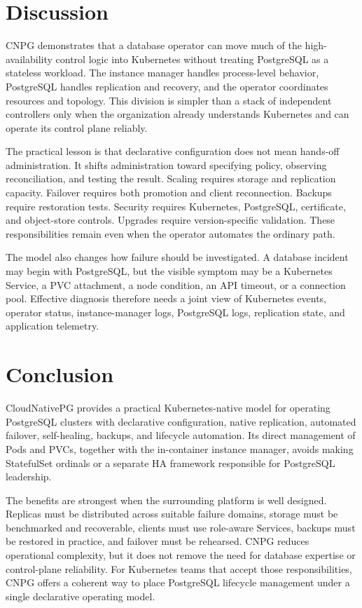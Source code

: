 \documentclass[11pt,a4paper]{article}
\begin{document}
\section{Discussion}

CNPG demonstrates that a database operator can move much of the high-availability control logic into Kubernetes without treating PostgreSQL as a stateless workload. The instance manager handles process-level behavior, PostgreSQL handles replication and recovery, and the operator coordinates resources and topology. This division is simpler than a stack of independent controllers only when the organization already understands Kubernetes and can operate its control plane reliably.

The practical lesson is that declarative configuration does not mean hands-off administration. It shifts administration toward specifying policy, observing reconciliation, and testing the result. Scaling requires storage and replication capacity. Failover requires both promotion and client reconnection. Backups require restoration tests. Security requires Kubernetes, PostgreSQL, certificate, and object-store controls. Upgrades require version-specific validation. These responsibilities remain even when the operator automates the ordinary path.

The model also changes how failure should be investigated. A database incident may begin with PostgreSQL, but the visible symptom may be a Kubernetes Service, a PVC attachment, a node condition, an API timeout, or a connection pool. Effective diagnosis therefore needs a joint view of Kubernetes events, operator status, instance-manager logs, PostgreSQL logs, replication state, and application telemetry.

\section{Conclusion}

CloudNativePG provides a practical Kubernetes-native model for operating PostgreSQL clusters with declarative configuration, native replication, automated failover, self-healing, backups, and lifecycle automation. Its direct management of Pods and PVCs, together with the in-container instance manager, avoids making StatefulSet ordinals or a separate HA framework responsible for PostgreSQL leadership.

The benefits are strongest when the surrounding platform is well designed. Replicas must be distributed across suitable failure domains, storage must be benchmarked and recoverable, clients must use role-aware Services, backups must be restored in practice, and failover must be rehearsed. CNPG reduces operational complexity, but it does not remove the need for database expertise or control-plane reliability. For Kubernetes teams that accept those responsibilities, CNPG offers a coherent way to place PostgreSQL lifecycle management under a single declarative operating model.
\end{document}
